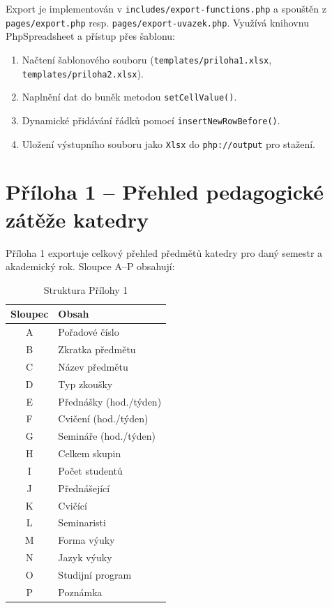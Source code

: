 \documentclass[12pt,a4paper]{report}
\begin{document}
Export je implementován v \texttt{includes/export-functions.php} a spouštěn z \texttt{pages/export.php} resp. \texttt{pages/export-uvazek.php}. Využívá knihovnu PhpSpreadsheet \cite{phpspreadsheet} a přístup přes šablonu:

\begin{enumerate}
  \item Načtení šablonového souboru (\texttt{templates/priloha1.xlsx}, \texttt{templates/priloha2.xlsx}).
  \item Naplnění dat do buněk metodou \texttt{setCellValue()}.
  \item Dynamické přidávání řádků pomocí \texttt{insertNewRowBefore()}.
  \item Uložení výstupního souboru jako \texttt{Xlsx} do \texttt{php://output} pro stažení.
\end{enumerate}

\section{Příloha 1 -- Přehled pedagogické zátěže katedry}

Příloha 1 exportuje celkový přehled předmětů katedry pro daný semestr a akademický rok. Sloupce A--P obsahují:

\begin{table}[H]
\centering
\small
\begin{tabular}{cl}
\toprule
\textbf{Sloupec} & \textbf{Obsah} \\
\midrule
A & Pořadové číslo \\
B & Zkratka předmětu \\
C & Název předmětu \\
D & Typ zkoušky \\
E & Přednášky (hod./týden) \\
F & Cvičení (hod./týden) \\
G & Semináře (hod./týden) \\
H & Celkem skupin \\
I & Počet studentů \\
J & Přednášející \\
K & Cvičící \\
L & Seminaristi \\
M & Forma výuky \\
N & Jazyk výuky \\
O & Studijní program \\
P & Poznámka \\
\bottomrule
\end{tabular}
\caption{Struktura Přílohy 1}
\end{table}
\end{document}
